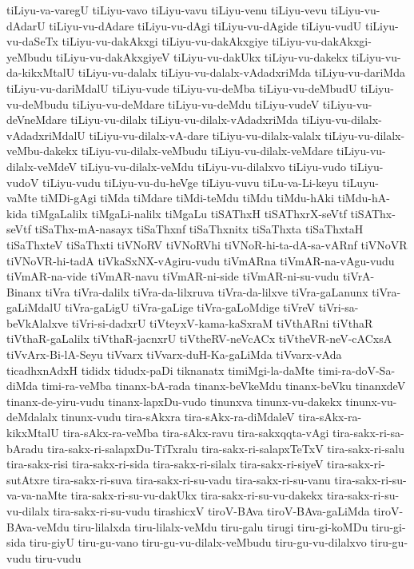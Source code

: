 {tiLiyu-va-varegU
tiLiyu-vavo
tiLiyu-vavu
tiLiyu-venu
tiLiyu-vevu
tiLiyu-vu-dAdarU
tiLiyu-vu-dAdare
tiLiyu-vu-dAgi
tiLiyu-vu-dAgide
tiLiyu-vudU
tiLiyu-vu-daSeTx
tiLiyu-vu-dakAkxgi
tiLiyu-vu-dakAkxgiye
tiLiyu-vu-dakAkxgi-yeMbudu
tiLiyu-vu-dakAkxgiyeV
tiLiyu-vu-dakUkx
tiLiyu-vu-dakekx
tiLiyu-vu-da-kikxMtalU
tiLiyu-vu-dalalx
tiLiyu-vu-dalalx-vAdadxriMda
tiLiyu-vu-dariMda
tiLiyu-vu-dariMdalU
tiLiyu-vude
tiLiyu-vu-deMba
tiLiyu-vu-deMbudU
tiLiyu-vu-deMbudu
tiLiyu-vu-deMdare
tiLiyu-vu-deMdu
tiLiyu-vudeV
tiLiyu-vu-deVneMdare
tiLiyu-vu-dilalx
tiLiyu-vu-dilalx-vAdadxriMda
tiLiyu-vu-dilalx-vAdadxriMdalU
tiLiyu-vu-dilalx-vA-dare
tiLiyu-vu-dilalx-valalx
tiLiyu-vu-dilalx-veMbu-dakekx
tiLiyu-vu-dilalx-veMbudu
tiLiyu-vu-dilalx-veMdare
tiLiyu-vu-dilalx-veMdeV
tiLiyu-vu-dilalx-veMdu
tiLiyu-vu-dilalxvo
tiLiyu-vudo
tiLiyu-vudoV
tiLiyu-vudu
tiLiyu-vu-du-heVge
tiLiyu-vuvu
tiLu-va-Li-keyu
tiLuyu-vaMte
tiMDi-gAgi
tiMda
tiMdare
tiMdi-teMdu
tiMdu
tiMdu-hAki
tiMdu-hA-kida
tiMgaLalilx
tiMgaLi-nalilx
tiMgaLu
tiSAThxH
tiSAThxrX-seVtf
tiSAThx-seVtf
tiSaThx-mA-nasayx
tiSaThxnf
tiSaThxnitx
tiSaThxta
tiSaThxtaH
tiSaThxteV
tiSaThxti
tiVNoRV
tiVNoRVhi
tiVNoR-hi-ta-dA-sa-vARnf
tiVNoVR
tiVNoVR-hi-tadA
tiVkaSxNX-vAgiru-vudu
tiVmARna
tiVmAR-na-vAgu-vudu
tiVmAR-na-vide
tiVmAR-navu
tiVmAR-ni-side
tiVmAR-ni-su-vudu
tiVrA-Binanx
tiVra
tiVra-dalilx
tiVra-da-lilxruva
tiVra-da-lilxve
tiVra-gaLanunx
tiVra-gaLiMdalU
tiVra-gaLigU
tiVra-gaLige
tiVra-gaLoMdige
tiVreV
tiVri-sa-beVkAlalxve
tiVri-si-dadxrU
tiVteyxV-kama-kaSxraM
tiVthARni
tiVthaR
tiVthaR-gaLalilx
tiVthaR-jacnxrU
tiVtheRV-neVcACx
tiVtheVR-neV-cACxsA
tiVvArx-Bi-lA-Seyu
tiVvarx
tiVvarx-duH-Ka-gaLiMda
tiVvarx-vAda
ticadhxnAdxH
tididx
tidudx-paDi
tiknanatx
timiMgi-la-daMte
timi-ra-doV-Sa-diMda
timi-ra-veMba
tinanx-bA-rada
tinanx-beVkeMdu
tinanx-beVku
tinanxdeV
tinanx-de-yiru-vudu
tinanx-lapxDu-vudo
tinunxva
tinunx-vu-dakekx
tinunx-vu-deMdalalx
tinunx-vudu
tira-sAkxra
tira-sAkx-ra-diMdaleV
tira-sAkx-ra-kikxMtalU
tira-sAkx-ra-veMba
tira-sAkx-ravu
tira-sakxqqta-vAgi
tira-sakx-ri-sa-bAradu
tira-sakx-ri-salapxDu-TiTxralu
tira-sakx-ri-salapxTeTxV
tira-sakx-ri-salu
tira-sakx-risi
tira-sakx-ri-sida
tira-sakx-ri-silalx
tira-sakx-ri-siyeV
tira-sakx-ri-sutAtxre
tira-sakx-ri-suva
tira-sakx-ri-su-vadu
tira-sakx-ri-su-vanu
tira-sakx-ri-su-va-va-naMte
tira-sakx-ri-su-vu-dakUkx
tira-sakx-ri-su-vu-dakekx
tira-sakx-ri-su-vu-dilalx
tira-sakx-ri-su-vudu
tirashicxV
tiroV-BAva
tiroV-BAva-gaLiMda
tiroV-BAva-veMdu
tiru-lilalxda
tiru-lilalx-veMdu
tiru-galu
tirugi
tiru-gi-koMDu
tiru-gi-sida
tiru-giyU
tiru-gu-vano
tiru-gu-vu-dilalx-veMbudu
tiru-gu-vu-dilalxvo
tiru-gu-vudu
tiru-vudu
}
